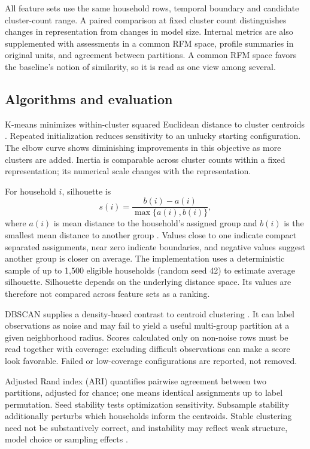 All feature sets use the same household rows, temporal boundary and candidate cluster-count range. A paired comparison at fixed cluster count distinguishes changes in representation from changes in model size. Internal metrics are also supplemented with assessments in a common RFM space, profile summaries in original units, and agreement between partitions. A common RFM space favors the baseline's notion of similarity, so it is read as one view among several.

\subsection{Algorithms and evaluation}
K-means minimizes within-cluster squared Euclidean distance to cluster centroids \cite{sklearnkmeans}. Repeated initialization reduces sensitivity to an unlucky starting configuration. The elbow curve shows diminishing improvements in this objective as more clusters are added. Inertia is comparable across cluster counts within a fixed representation; its numerical scale changes with the representation.

For household $i$, silhouette is
\[
s(i)=\frac{b(i)-a(i)}{\max\{a(i),b(i)\}},
\]
where $a(i)$ is mean distance to the household's assigned group and $b(i)$ is the smallest mean distance to another group \cite{sklearnsilhouette}. Values close to one indicate compact separated assignments, near zero indicate boundaries, and negative values suggest another group is closer on average. The implementation uses a deterministic sample of up to 1,500 eligible households (random seed 42) to estimate average silhouette. Silhouette depends on the underlying distance space. Its values are therefore not compared across feature sets as a ranking.

DBSCAN supplies a density-based contrast to centroid clustering \cite{sklearndbscan}. It can label observations as noise and may fail to yield a useful multi-group partition at a given neighborhood radius. Scores calculated only on non-noise rows must be read together with coverage: excluding difficult observations can make a score look favorable. Failed or low-coverage configurations are reported, not removed.

Adjusted Rand index (ARI) quantifies pairwise agreement between two partitions, adjusted for chance; one means identical assignments up to label permutation. Seed stability tests optimization sensitivity. Subsample stability additionally perturbs which households inform the centroids. Stable clustering need not be substantively correct, and instability may reflect weak structure, model choice or sampling effects \cite{luxburg2010stability}.

